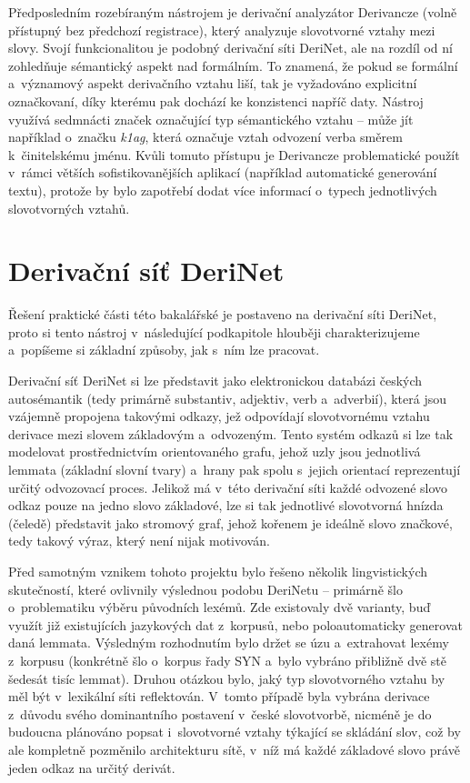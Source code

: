Předposledním rozebíraným nástrojem je derivační analyzátor Derivancze
(volně přístupný bez předchozí registrace), který analyzuje slovotvorné
vztahy mezi slovy. Svojí funkcionalitou je podobný derivační síti
DeriNet, ale na rozdíl od ní zohledňuje sémantický aspekt nad formálním.
To znamená, že pokud se formální a~významový aspekt derivačního vztahu
liší, tak je vyžadováno explicitní označkovaní, díky kterému pak dochází
ke konzistenci napříč daty. Nástroj využívá sedmnácti značek označující
typ sémantického vztahu -- může jít například o~značku \emph{k1ag},
která označuje vztah odvození verba směrem k~činitelskému jménu. Kvůli
tomuto přístupu je Derivancze problematické použít v~rámci větších
sofistikovanějších aplikací (například automatické generování textu),
protože by bylo zapotřebí dodat více informací o~typech jednotlivých
slovotvorných vztahů.~\parencite{derivancze}

\hypertarget{derivaux10dnuxed-suxedux165-derinet}{%
\section{Derivační síť
DeriNet}\label{derivaux10dnuxed-suxedux165-derinet}}

Řešení praktické části této bakalářské je postaveno na derivační síti
DeriNet, proto si tento nástroj v~následující podkapitole hlouběji
charakterizujeme a~popíšeme si základní způsoby, jak s~ním lze pracovat.

Derivační síť DeriNet si lze představit jako elektronickou databázi
českých autosémantik (tedy primárně substantiv, adjektiv, verb
a~adverbií), která jsou vzájemně propojena takovými odkazy, jež odpovídají
slovotvornému vztahu derivace mezi slovem základovým a~odvozeným. Tento
systém odkazů si lze tak modelovat prostřednictvím orientovaného grafu,
jehož uzly jsou jednotlivá lemmata (základní slovní tvary) a~hrany pak
spolu s~jejich orientací reprezentují určitý odvozovací proces. Jelikož
má v~této derivační síti každé odvozené slovo odkaz pouze na jedno slovo
základové, lze si tak jednotlivé slovotvorná hnízda (čeledě) představit
jako stromový graf, jehož kořenem je ideálně slovo značkové, tedy takový
výraz, který není nijak motivován.~\parencite{derinet-cz}

Před samotným vznikem tohoto projektu bylo řešeno několik lingvistických
skutečností, které ovlivnily výslednou podobu DeriNetu -- primárně šlo
o~problematiku výběru původních lexémů. Zde existovaly dvě varianty, buď
využít již existujících jazykových dat z~korpusů, nebo poloautomaticky
generovat daná lemmata. Výsledným rozhodnutím bylo držet se úzu
a~extrahovat lexémy z~korpusu (konkrétně šlo o~korpus řady SYN a~bylo
vybráno přibližně dvě stě šedesát tisíc lemmat). Druhou otázkou bylo,
jaký typ slovotvorného vztahu by měl být v~lexikální síti reflektován.
V~tomto případě byla vybrána derivace z~důvodu svého dominantního
postavení v~české slovotvorbě, nicméně je do budoucna plánováno popsat
i~slovotvorné vztahy týkající se skládání slov, což by ale kompletně
pozměnilo architekturu sítě, v~níž má každé základové slovo právě jeden
odkaz na určitý derivát.~\parencite{sevcikova14}

